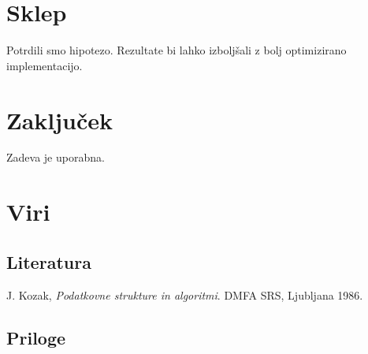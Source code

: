 \documentclass[a4paper,oneside]{article}
\begin{document}
\section{Sklep}
Potrdili smo hipotezo. Rezultate bi lahko izboljšali z bolj optimizirano implementacijo.
\section{Zaključek}
Zadeva je uporabna.
\section{Viri}
\subsection{Literatura}
\vspace{-1cm}
\begin{thebibliography}{99}
   {J. Kozak, \emph{Podatkovne strukture in algoritmi}. DMFA SRS, Ljubljana 1986. }
\end{thebibliography}
\subsection{Priloge}
\end{document}
